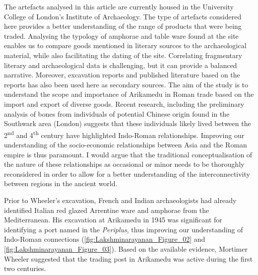 The artefacts analysed in this article are currently housed in the University College of London’s Institute of Archaeology. The type of artefacts considered here provides a better understanding of the range of products that were being traded. Analysing the typology of amphorae and table ware found at the site enables us to compare goods mentioned in literary sources to the archaeological material, while also facilitating the dating of the site. Correlating fragmentary literary and archaeological data is challenging, but it can provide a balanced narrative. Moreover, excavation reports and published literature based on the reports has also been used here as secondary sources. The aim of the study is to understand the scope and importance of Arikamedu in Roman trade based on the import and export of diverse goods. Recent research, including the preliminary analysis of bones from individuals of potential Chinese origin found in the Southwark area (London) suggests that these individuals likely lived between the 2\textsuperscript{nd} and 4\textsuperscript{th} century\AD \parencite{redfern2016} have highlighted Indo-Roman relationships. Improving our understanding of the socio-economic relationships between Asia and the Roman empire is thus paramount. I would argue that the traditional conceptualisation of the nature of these relationships as occasional or minor needs to be thoroughly reconsidered in order to allow for a better understanding of the interconnectivity between regions in the ancient world.


Prior to Wheeler’s excavation, French and Indian archaeologists had already identified Italian red glazed Arrentine ware and amphorae from the Mediterranean. His excavation at Arikamedu in 1945 was significant for identifying a port named in the \emph{Periplus}, thus improving our understanding of Indo-Roman connections (\cref{fig:Lakshminarayanan_Figure_02} and \cref{fig:Lakshminarayanan_Figure_03}). Based on the available evidence, Mortimer Wheeler suggested that the trading post in Arikamedu was active during the first two centuries\AD.

